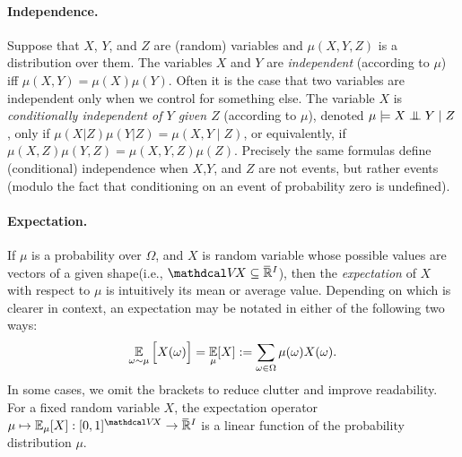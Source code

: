 \paragraph{%
    Independence.} 
Suppose that $X$, $Y$, and $Z$ are (random) variables and $\mu(X,Y,Z)$ is a distribution over them.
The variables $X$ and $Y$ are \emph{independent} (according to $\mu$) iff $\mu(X,Y) = \mu(X)\mu(Y)$.
Often it is the case that two variables are independent only when we control for something else.
The variable ${X}$ is \emph{conditionally independent of ${Y}$ given ${Z}$} 
(according to $\mu$),  denoted 
$\mu \models {X} \mathrel{\perp\mspace{-10mu}\perp} {Y} \mid {Z}$, 
only if $\mu(X | Z) \mu(Y | Z) = \mu(X,Y \mid Z)$,
or equivalently, if
$\mu(X,Z) \mu(Y,Z) = \mu(X,Y,Z) \mu(Z)$. 
Precisely the same formulas define (conditional) independence
    when $X$,$Y$, and $Z$ are not events, but rather events
    (modulo the fact that conditioning on an event of probability zero is undefined).





\paragraph{Expectation.%
    } 
If $\mu$ is a probability over $\Omega$, and $X$ is random variable 
whose possible values are vectors of a given shape(i.e., $\V \! X \subseteq \Rext^I$), then the \emph{expectation} of $X$ with respect to $\mu$ is intuitively its mean or average value.
Depending on which is clearer in context, 
    an expectation may be notated in either of the following two ways:
\[
    \operatorname*{\mathbb{E}}_{\omega \sim \mu} \Big[ X(\omega) \Big]
        = \operatorname*{\mathbb{E}}_{\mu}[ X ]  
        := \sum_{\omega \in \Omega} \mu(\omega) X(\omega).
\]
In some cases, we omit the brackets to reduce clutter and improve readability.
For a fixed random variable $X$, the expectation operator $\mu \mapsto \Ex_\mu[X] : [0,1]^{\V\! X} \to \Rext^I$ is a linear function of the probability distribution $\mu$.


